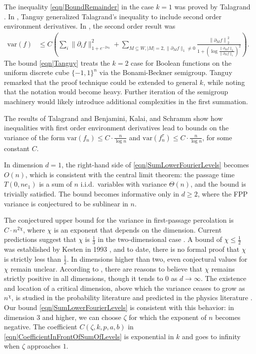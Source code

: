 \documentclass[reqno]{amsart}
\begin{document}
The inequality \eqref{eqn|BoundRemainder} in the case $k=1$ was proved by Talagrand \cite{talagrand1994}. In \cite{Tanguy2018}, Tanguy generalized Talagrand's inequality to include second order environment derivatives. In \cite{Tanguy2018}, the second order result was
\begin{align}
\text{var}(f)&\leq C\left(\sum_{i} \|\partial_if\|_{1+e^{-2s_0}}^2 + 
\sum_{M\subseteq W, |M|=2, \|\partial_Mf\|_1\neq 0}\frac{ \left\|\partial_Mf\right\|_2^2}{
1+\left(\log\frac{\|\partial_Mf\|_2}{\|\partial_Mf\|_1}\right)^2
}\right).
\label{eqn|Tanguy}
\end{align}
The bound \eqref{eqn|Tanguy} treats the $k=2$ case for Boolean functions on the uniform discrete cube 
$\{-1,1\}^n$ via the Bonami-Beckner semigroup. Tanguy \cite{Tanguy2018} remarked that the proof technique could be extended to general $k$, while noting that the notation would become heavy. Further iteration of the semigroup machinery would likely introduce additional complexities in the first summation.  


The results of Talagrand \cite{talagrand1994} and Benjamini, Kalai, and Schramm \cite{benjamini2006}
show how inequalities with first order environment derivatives lead to bounds on the variance of the form $\text{var}(f_n)\leq C\cdot \frac{n}{\log n}$ and $\text{var}(f^{\tau}_n)\leq C\cdot\frac{n}{\log n}$, for some constant $C$. 
 
 


In dimension $d = 1$, the right-hand side of \eqref{eqn|SumLowerFourierLevels} becomes $O(n)$, which 
is consistent with the central limit theorem: the passage time $T(0,ne_1)$ 
is a sum of $n$ i.i.d.\ variables with variance $\Theta(n)$, and the bound 
is trivially satisfied. The bound becomes informative only in $d \geq 2$, 
where the FPP variance is conjectured to be sublinear in $n$.



The conjectured upper bound for the variance in first-passage percolation is $C\cdot n^{2\chi}$, where $\chi$ is an exponent that depends on the dimension. 
Current predictions suggest that $\chi$ is $\frac13$ in the two-dimensional case \cite{AuffingerDamronHanson2017}. 
A bound of $\chi\leq\frac12$ was established by Kesten in 1993 \cite{Kesten1993}, and to date, there is no formal proof that $\chi$ is strictly less than $\frac12$. 
In dimensions higher than two, even conjectural values for $\chi$ remain unclear. According to \cite{AuffingerDamronHanson2017}, there are reasons to believe that $\chi$ 
remains strictly positive in all dimensions, though it tends to $0$ as $d\to\infty$. 
The existence and location of a critical dimension, above which the variance ceases to grow as $n^{\chi}$, is studied in the probability literature \cite{AlexanderFPPCriticalDim2023} and predicted in the physics literature \cite{Fogedby2006}. 
Our bound \eqref{eqn|SumLowerFourierLevels} is consistent with this behavior: in dimension $3$ and higher, we can choose $\zeta$ for which the exponent of $n$ becomes negative. 
The coefficient $C(\zeta,k,p,a,b)$ in \eqref{eqn|CoefficientInFrontOfSumOfLevels} is exponential in $k$ and goes to infinity when $\zeta$ approaches $1$.
 
\end{document}
